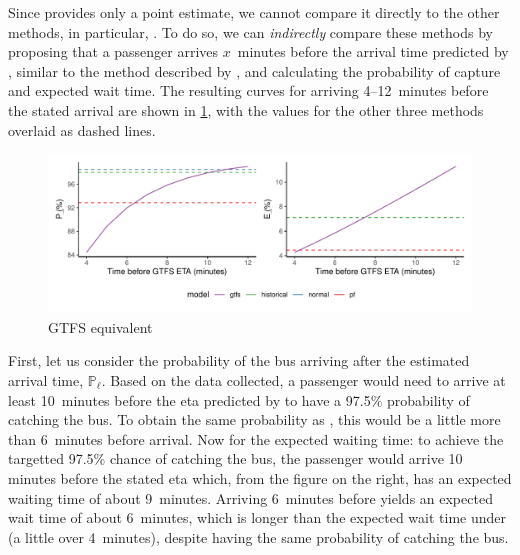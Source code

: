 Since \Fsched{} provides only a point estimate, we cannot compare it directly to the other methods, in particular, \Fpf{}. To do so, we can \emph{indirectly} compare these methods by proposing that a passenger arrives $x$~minutes before the arrival time predicted by \Fsched{}, similar to the method described by \citet{Cathey_2003}, and calculating the probability of capture and expected wait time. The resulting curves for arriving 4--12~minutes before the stated arrival are shown in \cref{fig:model_results_pr_gtfs}, with the values for the other three methods overlaid as dashed lines.


\begin{knitrout}\small
{}\color{fgcolor}\begin{figure}

{\centering \includegraphics[width=\textwidth]{figure/model_results_pr_gtfs-1} 

}

\caption[GTFS equivalent]{GTFS equivalent}\label{fig:model_results_pr_gtfs}
\end{figure}


\end{knitrout}



First, let us consider the probability of the bus arriving after the estimated arrival time, $\mathbb{P}_\ell$. Based on the data collected, a passenger would need to arrive at least 10~minutes before the \gls{eta} predicted by \Fsched{} to have a 97.5\% probability of catching the bus. To obtain the same probability as \Fpf{}, this would be a little more than 6~minutes before arrival. Now for the expected waiting time: to achieve the targetted 97.5\% chance of catching the bus, the passenger would arrive 10 minutes before the stated \gls{eta} which, from the figure on the right, has an expected waiting time of about 9~minutes. Arriving 6~minutes before yields an expected wait time of about 6~minutes, which is longer than the expected wait time under \Fpf{} (a little over 4~minutes), despite having the same probability of catching the bus.



